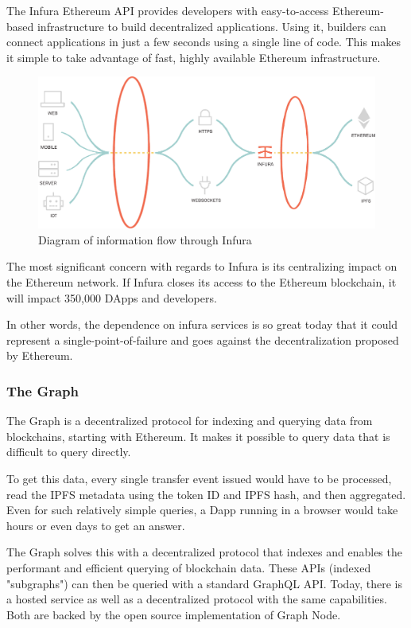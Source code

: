 \documentclass[MSE,Master,english]{twbook}%
\begin{document}
The Infura Ethereum API provides developers with easy-to-access Ethereum-based infrastructure to build decentralized applications. Using it, builders can connect applications in just a few seconds using a single line of code. This makes it simple to take advantage of fast, highly available Ethereum infrastructure.\cite{infura}

\begin{figure}[H]
  \centering
  \includegraphics[width=\textwidth]{infura.png}
  \caption{Diagram of information flow through Infura \cite{infura}}
  \label{fig:infura}
\end{figure}

The most significant concern\cite{infuraCons} with regards to Infura is its centralizing impact on the Ethereum network. If Infura closes its access to the Ethereum blockchain, it will impact 350,000 \glspl{DApp} and developers.\cite{infuraUsers}

In other words, the dependence on infura services is so great today that it could represent a single-point-of-failure and goes against the decentralization proposed by Ethereum.

\subsubsection{The Graph}
The Graph\cite{thegraph} is a decentralized protocol for indexing and querying data from blockchains, starting with Ethereum. It makes it possible to query data that is difficult to query directly.

To get this data, every single transfer event issued would have to be processed, read the \gls{IPFS}\cite{ipfs} metadata using the token ID and \gls{IPFS} hash, and then aggregated. Even for such relatively simple queries, a \ac{Dapp} running in a browser would take hours or even days to get an answer.\cite{thegraph}

The Graph solves this with a decentralized protocol that indexes and enables the performant and efficient querying of blockchain data. These APIs (indexed "subgraphs") can then be queried with a standard GraphQL API. Today, there is a hosted service as well as a decentralized protocol with the same capabilities. Both are backed by the open source implementation of Graph Node.\cite{thegraph}
\end{document}
